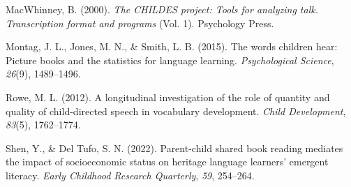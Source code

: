 \documentclass[10pt, letterpaper]{article}
\newenvironment{CSLReferences}%
  {}%
  {\par}
\begin{document}
\begin{CSLReferences}{1}{0}
\leavevmode\hypertarget{ref-macwhinney2000childes}{}%
MacWhinney, B. (2000). \emph{The CHILDES project: Tools for analyzing
talk. Transcription format and programs} (Vol. 1). Psychology Press.

\leavevmode\hypertarget{ref-montag2015words}{}%
Montag, J. L., Jones, M. N., \& Smith, L. B. (2015). The words children
hear: Picture books and the statistics for language learning.
\emph{Psychological Science}, \emph{26}(9), 1489--1496.

\leavevmode\hypertarget{ref-rowe2012longitudinal}{}%
Rowe, M. L. (2012). A longitudinal investigation of the role of quantity
and quality of child-directed speech in vocabulary development.
\emph{Child Development}, \emph{83}(5), 1762--1774.

\leavevmode\hypertarget{ref-shen2022parent}{}%
Shen, Y., \& Del Tufo, S. N. (2022). Parent-child shared book reading
mediates the impact of socioeconomic status on heritage language
learners' emergent literacy. \emph{Early Childhood Research Quarterly},
\emph{59}, 254--264.

\end{CSLReferences}


\end{document}
